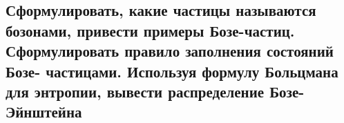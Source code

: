 \subsection{Сформулировать, какие частицы называются бозонами, привести примеры Бозе-частиц.
Сформулировать правило заполнения состояний Бозе- частицами. Используя формулу Больцмана
для энтропии, вывести распределение Бозе-Эйнштейна}


